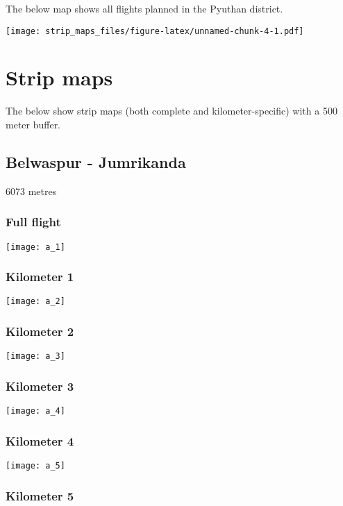 \documentclass[]{article}
\begin{document}
The below map shows all flights planned in the Pyuthan district.

\texttt{[image: strip\_maps\_files/figure-latex/unnamed-chunk-4-1.pdf]}

\newpage

\section{Strip maps}\label{strip-maps}

The below show strip maps (both complete and kilometer-specific) with a
500 meter buffer.

\newpage

\subsection{Belwaspur - Jumrikanda}\label{belwaspur---jumrikanda}

6073 metres

\subsubsection{Full flight}\label{full-flight}

\texttt{[image: a\_1]}

\subsubsection{Kilometer 1}\label{kilometer-1}

\texttt{[image: a\_2]}

\subsubsection{Kilometer 2}\label{kilometer-2}

\texttt{[image: a\_3]}

\subsubsection{Kilometer 3}\label{kilometer-3}

\texttt{[image: a\_4]}

\subsubsection{Kilometer 4}\label{kilometer-4}

\texttt{[image: a\_5]}

\subsubsection{Kilometer 5}\label{kilometer-5}
\end{document}
